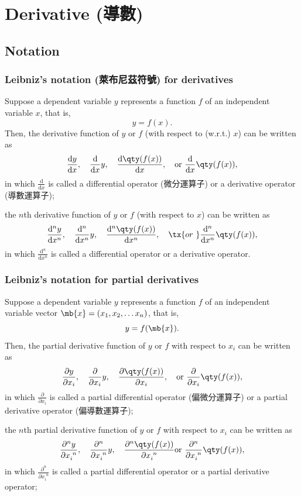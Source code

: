 \section{Derivative (導數)}
\subsection{Notation}
\subsubsection{Leibniz's notation (萊布尼茲符號) for derivatives}
Suppose a dependent variable $y$ represents a function $f$ of an independent variable $x$, that is,
\[y=f(x).\]
Then, the derivative function of $y$ or $f$ (with respect to (w.r.t.) $x$) can be written as
\[\frac{\mathrm{d}y}{\mathrm{d}x},\quad\frac{\mathrm{d}}{\mathrm{d}x}y,\quad\frac{\mathrm{d}\qty(f(x))}{\mathrm{d}x},\quad\text{or\ }\frac{\mathrm{d}}{\mathrm{d}x}\qty(f(x)),\]
in which $\frac{\mathrm{d}}{\mathrm{d}x}$ is called a differential operator (微分運算子) or a derivative operator (導數運算子);

the $n$th derivative function of $y$ or $f$ (with respect to $x$) can be written as
\[\frac{\mathrm{d}^ny}{\mathrm{d}x^n},\quad\frac{\mathrm{d}^n}{\mathrm{d}x^n}y,\quad\frac{\mathrm{d}^n\qty(f(x))}{\mathrm{d}x^n},\quad\tx{or\ }\frac{\mathrm{d}^n}{\mathrm{d}x^n}\qty(f(x)),\]
in which $\frac{\mathrm{d}^n}{\mathrm{d}x^n}$ is called a differential operator or a derivative operator.
\subsubsection{Leibniz's notation for partial derivatives}
Suppose a dependent variable $y$ represents a function $f$ of an independent variable vector $\mb{x}=(x_1,x_2,\dots x_n)$, that is,
\[y=f(\mb{x}).\]
Then, the partial derivative function of $y$ or $f$ with respect to $x_i$ can be written as
\[\frac{\partial y}{\partial x_i},\quad\frac{\partial }{\partial x_i}y,\quad\frac{\partial \qty(f(x))}{\partial x_i},\quad\text{or\ }\frac{\partial }{\partial x_i}\qty(f(x)),\]
in which $\frac{\partial}{\partial x_i}$ is called a partial differential operator (偏微分運算子) or a partial derivative operator (偏導數運算子);

the $n$th partial derivative function of $y$ or $f$ with respect to $x_i$ can be written as
\[\frac{\partial^ny}{\partial x_i^{\phantom{i}n}},\quad\frac{\partial^n}{\partial x_i^{\phantom{i}n}}y,\quad\frac{\partial^n\qty(f(x))}{\partial x_i^{\phantom{i}n}}\text{or\ }\frac{\partial^n}{\partial x_i^{\phantom{i}n}}\qty(f(x)),\]
in which $\frac{\partial^n}{\partial x_i^{\phantom{i}n}}$ is called a partial differential operator or a partial derivative operator;

